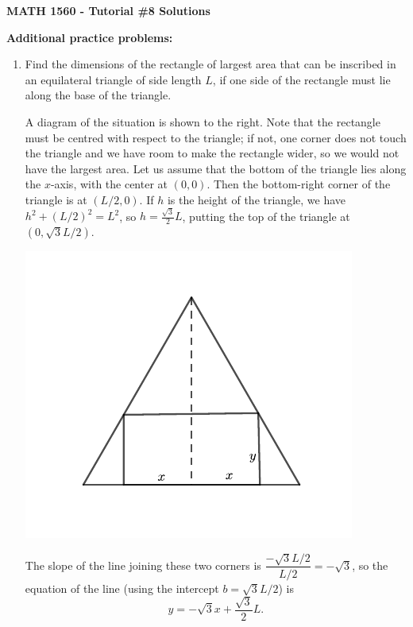 \documentclass[12pt]{article}
\begin{document}
\author{Instructor: Sean Fitzpatrick}
\thispagestyle{empty}
\begin{center}
{\bf MATH 1560 - Tutorial \#8 Solutions}
\end{center}

\textbf{Additional practice problems:}
\begin{enumerate}
\item Find the dimensions of the rectangle of largest area that can be inscribed in an equilateral triangle of side length $L$, if one side of the rectangle must lie along  the base of the triangle.

\begin{multicols}{2}
A diagram of the situation is shown to the right. Note that the rectangle must be centred with respect to the triangle; if not, one corner does not touch the triangle and we have room to make the rectangle wider, so we would not have the largest area. Let us assume that the bottom of the triangle lies along the $x$-axis, with the center at $(0,0)$. Then the bottom-right corner of the triangle is at $(L/2,0)$. If $h$ is the height of the triangle, we have $h^2+(L/2)^2=L^2$, so $h=\frac{\sqrt{3}}{2}L$, putting the top of the triangle at $(0,\sqrt{3}L/2)$.

\columnbreak

\begin{center}
\includegraphics[width=\columnwidth]{Tut8-01sol}
\end{center}
\end{multicols}
The slope of the line joining these two corners is $\dfrac{-\sqrt{3}L/2}{L/2} = -\sqrt{3}$, so the equation of the line (using the intercept $b=\sqrt{3}L/2$) is
\[
y = -\sqrt{3}x+\frac{\sqrt{3}}{2}L.
\]


\end{enumerate}
\end{document}
